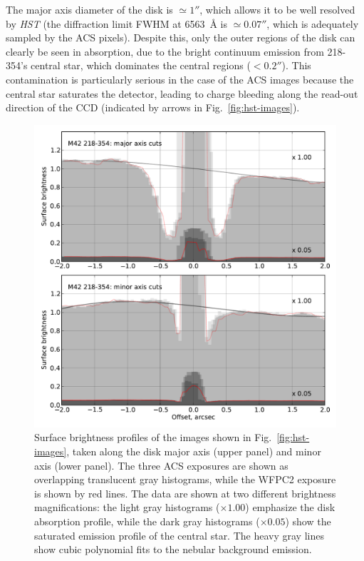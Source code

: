 \documentclass[oneside, 11pt]{article}
\begin{document}
The major axis diameter of the disk is \(\simeq 1''\), which allows it to be well resolved by \textit{HST} (the diffraction limit FWHM at 6563~\AA{} is \(\simeq 0.07''\), which is adequately sampled by the ACS pixels).  Despite this, only the outer regions of the disk can clearly be seen in absorption, due to the bright continuum emission from 218-354's central star, which dominates the central regions (\(< 0.2''\)).   This contamination is particularly serious in the case of the ACS images because the central star saturates the detector, leading to charge bleeding along the read-out direction of the CCD (indicated by arrows in Fig.~\ref{fig:hst-images}). 

\begin{figure}
  \centering
  \includegraphics[width=\linewidth]{profiles-acs-218-354}
  \caption{Surface brightness profiles of the images shown in Fig.~\ref{fig:hst-images}, taken along the disk major axis (upper panel) and minor axis (lower panel).  
    The three ACS exposures are shown as overlapping translucent gray histograms, while the WFPC2 exposure is shown by red lines.
  The data are shown at two different brightness magnifications: the light gray histograms (\(\times 1.00\)) emphasize the disk absorption profile, while the dark gray histograms (\(\times 0.05\)) show the saturated emission profile of the central star.  
  The heavy gray lines show cubic polynomial fits to the nebular background emission. }
  \label{fig:hst-profiles}
\end{figure}
\end{document}
